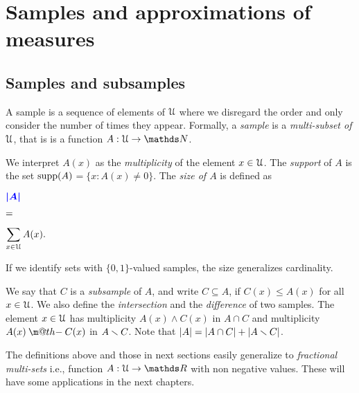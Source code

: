 \documentclass[sputnik.tex]{subfiles}
\begin{document}
\def\Fr{\mathop{\rm Fr}}

\def\vc{{\footnotesize VC}}
\def\nip{{\footnotesize NIP}}


\def\medrel#1{\parbox[t]{6ex}{$\displaystyle\hfil #1$}}
\def\ceq#1#2#3{\parbox[t]{25ex}{$\displaystyle #1$}\medrel{#2}{$\displaystyle #3$}}



\chapter{Samples and approximations of measures}


\section{Samples and subsamples}\label{multisets}

\def\ceq#1#2#3{\parbox[t]{32ex}{$\displaystyle #1$}\parbox{5ex}{$\displaystyle\hfil #2$}{$\displaystyle #3$}}

A sample is a sequence of elements of $\EuScript U$ where we disregard the order and only consider the number of times they appear.
Formally, a \emph{sample\/} is a \emph{multi-subset of $\EuScript U$}, that is is a function $A:\U\to\NN$. 

We interpret $A(x)$ as the \emph{multiplicity\/} of the element $x\in\EuScript U$.
The \emph{support\/} of $A$ is the set \emph{$\mathop{\rm supp}(A)$}$=\{x:A(x)\neq0\}$.
The \emph{size of $A$\/} is defined as

\ceq{\hfill\emph{$|A|$}}{=}{\sum_{x\in\U} A(x).}

If we identify sets with $\{0,1\}$-valued samples, the size generalizes cardinality. 

\makeatletter
\def\dotminus{\mathbin{\ooalign{\hidewidth\raise1ex\hbox{.}\hidewidth\cr$\m@th-$\cr}}}
\makeatother

We say that $C$ is a \emph{subsample\/} of $A$, and write \emph{$C\subseteq A$}, if $C(x)\le A(x)$ for all $x\in\EuScript U$.
We also define the \emph{intersection\/} and the \emph{difference\/} of two samples.
The element $x\in\EuScript U$ has multiplicity  $A(x)\wedge C(x)$ in \emph{$A\cap C$\/} and multiplicity  $A(x)\dotminus C(x)$ in \emph{$A\smallsetminus C$}.
Note that $|A|=|A\cap C|+|A\smallsetminus C|$.


The definitions above and those in next sections easily generalize to \emph{fractional multi-sets\/} i.e., function $A:\U\to\RR$ with non negative values.
These will have some applications in the next chapters.
\end{document}
